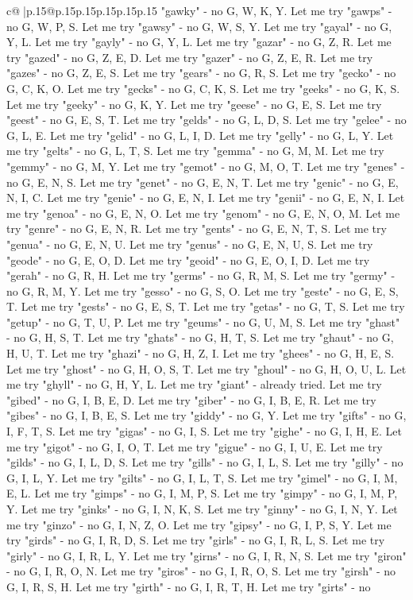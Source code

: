 \documentclass{article}
\begin{document}
{\begin{supertabular}{c@{$\;$}|p{.15\linewidth}@{}p{.15\linewidth}p{.15\linewidth}p{.15\linewidth}p{.15\linewidth}p{.15\linewidth}}
{{{"gawky" {-} no G, W, K, Y. Let me try "gawps" {-} no G, W, P, S. Let me try "gawsy" {-} no G, W, S, Y. Let me try "gayal" {-} no G, Y, L. Let me try "gayly" {-} no G, Y, L. Let me try "gazar" {-} no G, Z, R. Let me try "gazed" {-} no G, Z, E, D. Let me try "gazer" {-} no G, Z, E, R. Let me try "gazes" {-} no G, Z, E, S. Let me try "gears" {-} no G, R, S. Let me try "gecko" {-} no G, C, K, O. Let me try "gecks" {-} no G, C, K, S. Let me try "geeks" {-} no G, K, S. Let me try "geeky" {-} no G, K, Y. Let me try "geese" {-} no G, E, S. Let me try "geest" {-} no G, E, S, T. Let me try "gelds" {-} no G, L, D, S. Let me try "gelee" {-} no G, L, E. Let me try "gelid" {-} no G, L, I, D. Let me try "gelly" {-} no G, L, Y. Let me try "gelts" {-} no G, L, T, S. Let me try "gemma" {-} no G, M, M. Let me try "gemmy" {-} no G, M, Y. Let me try "gemot" {-} no G, M, O, T. Let me try "genes" {-} no G, E, N, S. Let me try "genet" {-} no G, E, N, T. Let me try "genic" {-} no G, E, N, I, C. Let me try "genie" {-} no G, E, N, I. Let me try "genii" {-} no G, E, N, I. Let me try "genoa" {-} no G, E, N, O. Let me try "genom" {-} no G, E, N, O, M. Let me try "genre" {-} no G, E, N, R. Let me try "gents" {-} no G, E, N, T, S. Let me try "genua" {-} no G, E, N, U. Let me try "genus" {-} no G, E, N, U, S. Let me try "geode" {-} no G, E, O, D. Let me try "geoid" {-} no G, E, O, I, D. Let me try "gerah" {-} no G, R, H. Let me try "germs" {-} no G, R, M, S. Let me try "germy" {-} no G, R, M, Y. Let me try "gesso" {-} no G, S, O. Let me try "geste" {-} no G, E, S, T. Let me try "gests" {-} no G, E, S, T. Let me try "getas" {-} no G, T, S. Let me try "getup" {-} no G, T, U, P. Let me try "geums" {-} no G, U, M, S. Let me try "ghast" {-} no G, H, S, T. Let me try "ghats" {-} no G, H, T, S. Let me try "ghaut" {-} no G, H, U, T. Let me try "ghazi" {-} no G, H, Z, I. Let me try "ghees" {-} no G, H, E, S. Let me try "ghost" {-} no G, H, O, S, T. Let me try "ghoul" {-} no G, H, O, U, L. Let me try "ghyll" {-} no G, H, Y, L. Let me try "giant" {-} already tried. Let me try "gibed" {-} no G, I, B, E, D. Let me try "giber" {-} no G, I, B, E, R. Let me try "gibes" {-} no G, I, B, E, S. Let me try "giddy" {-} no G, Y. Let me try "gifts" {-} no G, I, F, T, S. Let me try "gigas" {-} no G, I, S. Let me try "gighe" {-} no G, I, H, E. Let me try "gigot" {-} no G, I, O, T. Let me try "gigue" {-} no G, I, U, E. Let me try "gilds" {-} no G, I, L, D, S. Let me try "gills" {-} no G, I, L, S. Let me try "gilly" {-} no G, I, L, Y. Let me try "gilts" {-} no G, I, L, T, S. Let me try "gimel" {-} no G, I, M, E, L. Let me try "gimps" {-} no G, I, M, P, S. Let me try "gimpy" {-} no G, I, M, P, Y. Let me try "ginks" {-} no G, I, N, K, S. Let me try "ginny" {-} no G, I, N, Y. Let me try "ginzo" {-} no G, I, N, Z, O. Let me try "gipsy" {-} no G, I, P, S, Y. Let me try "girds" {-} no G, I, R, D, S. Let me try "girls" {-} no G, I, R, L, S. Let me try "girly" {-} no G, I, R, L, Y. Let me try "girns" {-} no G, I, R, N, S. Let me try "giron" {-} no G, I, R, O, N. Let me try "giros" {-} no G, I, R, O, S. Let me try "girsh" {-} no G, I, R, S, H. Let me try "girth" {-} no G, I, R, T, H. Let me try "girts" {-} no }}}
\end{supertabular}}
\end{document}
